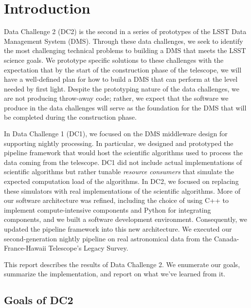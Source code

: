 
\section{Introduction}

Data Challenge 2 (DC2) is the second in a series of prototypes of
the LSST Data Management System (DMS).  Through these data challenges,
we seek to identify the most challenging technical problems to
building a DMS that meets the LSST science goals.  We prototype
specific solutions to these challenges with the expectation that by
the start of the construction phase of the telescope, we will have a
well-defined plan for how to build a DMS that can perform at the
level needed by first light.  Despite the prototyping nature of the
data challenges, we are not producing throw-away code; rather, we
expect that the software we produce in the data challenges will serve as
the foundation for the DMS that will be completed during the construction
phase.  

In Data Challenge 1 (DC1), we focused on the DMS middleware design for
supporting nightly processing.  In particular, we designed and
prototyped the pipeline framework that would host the scientific
algorithms used to process the data coming from the telescope.  DC1
did not include actual implementations of scientific algorithms but
rather tunable \emph{resource consumers} that simulate the expected
computation load of the algorithms.  In DC2, we focused on replacing
these simulators with real implementations of the scientific
algorithms.  More of our software architecture was refined, including
the choice of using C++ to implement compute-intensive components and
Python for integrating components, and we built a software development
environment.  Consequently, we updated the pipeline framework into
this new architecture.  We executed our second-generation nightly pipeline
on real astronomical data from the Canada-France-Hawaii Telescope's
Legacy Survey.  

This report describes the results of Data Challenge 2.  We enumerate
our goals, summarize the implementation, and report on what we've
learned from it.  

\subsection{Goals of DC2}
\label{Goals}

